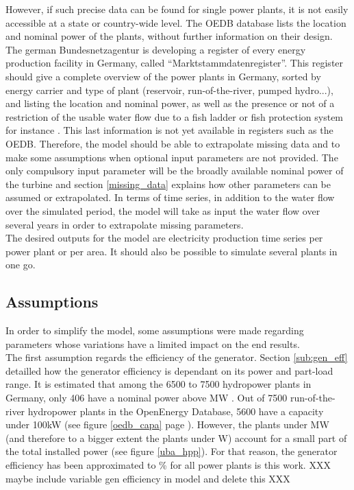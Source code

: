 However, if such precise data can be found for single power plants, it is not easily accessible at a state or country-wide level. The OEDB database lists the location and nominal power of the plants, without further information on their design. The german Bundesnetzagentur is developing a register of every energy production facility in Germany, called ``Marktstammdatenregister''. This register should give a complete overview of the power plants in Germany, sorted by energy carrier and type of plant (reservoir, run-of-the-river, pumped hydro...), and listing the location and nominal power, as well as the presence or not of a restriction of the usable water flow due to a fish ladder or fish protection system for instance \cite{MaStR}. This last information is not yet available in registers such as the OEDB.\newline
Therefore, the model should be able to extrapolate missing data and to make some assumptions when optional input parameters are not provided. The only compulsory input parameter will be the broadly available nominal power of the turbine and section \ref{missing_data} explains how other parameters can be assumed or extrapolated. \newline
In terms of time series, in addition to the water flow over the simulated period, the model will take as input the water flow over several years in order to extrapolate missing parameters.\\
The desired outputs for the model are electricity production time series per power plant or per area. It should also be possible to simulate several plants in one go.

\subsection{Assumptions}

In order to simplify the model, some assumptions were made regarding parameters whose variations have a limited impact on the end results. \\
The first assumption regards the efficiency of the generator. Section \ref{sub:gen_eff} detailled how the generator efficiency is dependant on its power and part-load range. It is estimated that among the 6500 to 7500 hydropower plants in Germany, only 406 have a nominal power above \unit[1]{MW} \cite{uba_wasserkraft}. Out of 7500 run-of-the-river hydropower plants in the OpenEnergy Database, 5600 have a capacity under 100kW (see figure \ref{oedb_capa} page \pageref{hpp_register}). However, the plants under \unit[1]{MW} (and therefore to a bigger extent the plants under \unit[100k]{W}) account for a small part of the total installed power (see figure \ref{uba_hpp}). For that reason, the generator efficiency has been approximated to \unit[95]{\%} for all power plants is this work. XXX maybe include variable gen efficiency in model and delete this XXX

